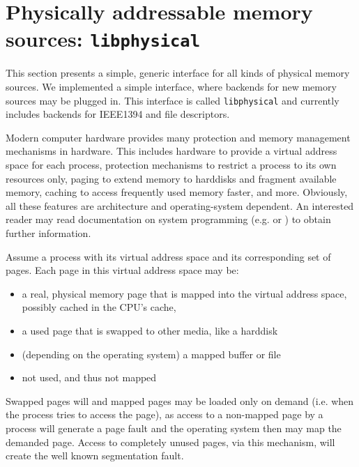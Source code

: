 %
%

\section{Physically addressable memory sources: \texttt{libphysical}}

\label{memsources}

This section presents a simple, generic interface for all kinds of physical
memory sources. We implemented a simple interface, where backends for new memory
sources may be plugged in. This interface is called \texttt{libphysical} and
currently includes backends for IEEE1394 and file descriptors.

Modern computer hardware provides many protection and memory management
mechanisms in hardware. This includes hardware to provide a virtual address
space for each process, protection mechanisms to restrict a process to its own
resources only, paging to extend memory to harddisks and fragment available
memory, caching to access frequently used memory faster, and more. Obviously,
all these features are architecture and operating-system dependent. An
interested reader may read documentation on system programming (e.g.
\cite{rwth_syspro_scriptum:2002} or \cite{IA32_SDM_3a:2006,IA32_SDM_3b:2006}) to
obtain further information.

Assume a process with its virtual address space and its corresponding set of
pages. Each page in this virtual address space may be:

\begin{itemize}

	\item a real, physical memory page that is mapped into the virtual 
		address space, possibly cached in the CPU's cache,

	\item a used page that is swapped to other media, like a harddisk

	\item (depending on the operating system) a mapped buffer or file

	\item not used, and thus not mapped

\end{itemize}

Swapped pages will and mapped pages may be loaded only on demand (i.e. when the
process tries to access the page), as access to a non-mapped page by a process
will generate a page fault and the operating system then may map the demanded
page.  Access to completely unused pages, via this mechanism, will create the
well known segmentation fault.

